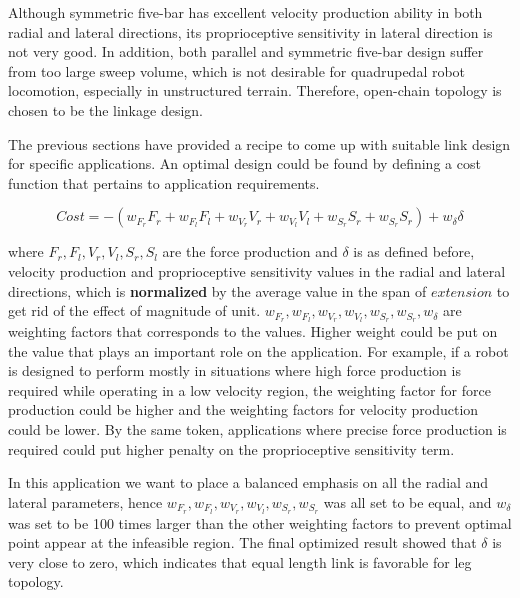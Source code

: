 	Although symmetric five-bar has excellent velocity production ability in both radial and lateral directions, its proprioceptive sensitivity in lateral direction is not very good. In addition, both parallel and symmetric five-bar design suffer from too large sweep volume, which is not desirable for quadrupedal robot locomotion, especially in unstructured terrain. Therefore, open-chain topology is chosen to be the linkage design.
	
	The previous sections have provided a recipe to come up with suitable link design for specific applications. An optimal design could be found by defining a cost function that pertains to application requirements. 
	
	\begin{equation}\label{eq:obj_func}
		Cost = - (w_{F_r} F_r + w_{F_l} F_l + w_{V_r} V_r + w_{V_l} V_l + w_{S_r} S_r + w_{S_r} S_r) + w_{\delta}\delta
	\end{equation}
	
	
	where $F_r,F_l,V_r,V_l,S_r,S_l$ are the force production and $\delta$ is as defined before, velocity production and proprioceptive sensitivity values in the radial and lateral directions, which is \textbf{normalized} by the average value in the span of $extension$ to get rid of the effect of magnitude of unit. $w_{F_r},w_{F_l},w_{V_r},w_{V_l},w_{S_r},w_{S_r},w_{\delta}$ are weighting factors that corresponds to the values. Higher weight could be put on the value that plays an important role on the application. For example, if a robot is designed to perform mostly in situations where high force production is required while operating in a low velocity region, the weighting factor for force production could be higher and the weighting factors for velocity production could be lower. By the same token, applications where precise force production is required could put higher penalty on the proprioceptive sensitivity term. 
	
	In this application we want to place a balanced emphasis on all the radial and lateral parameters, hence $w_{F_r},w_{F_l},w_{V_r},w_{V_l},w_{S_r},w_{S_r}$ was all set to be equal, and $w_{\delta}$ was set to be 100 times larger than the other weighting factors to prevent optimal point appear at the infeasible region. The final optimized result showed that $\delta$ is very close to zero, which indicates that equal length link is favorable for leg topology.
	
	
